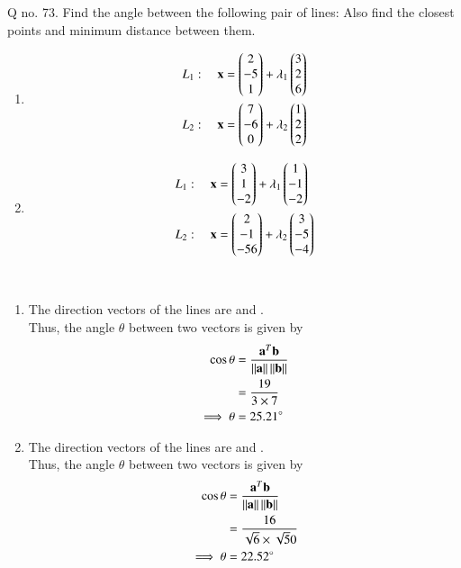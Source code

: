 \documentclass[journal,12pt,twocolumn]{IEEEtran}
\begin{document}
\noindent Q no. 73. Find the angle between the following pair of lines: Also find the closest points and minimum distance between them.
\begin{enumerate}
\item
\begin{align}
L_1: \quad \mathbf{x} &= \begin{pmatrix}2\\-5\\1\end{pmatrix} + \lambda_1\begin{pmatrix}3 \\ 2 \\6\end{pmatrix}
\\
L_2: \quad \mathbf{x} &= \begin{pmatrix}7\\-6\\0\end{pmatrix} + \lambda_2\begin{pmatrix}1 \\ 2 \\2\end{pmatrix}
\end{align}
\item
\begin{align}
L_1: \quad \mathbf{x} &= \begin{pmatrix}3\\1\\-2\end{pmatrix} + \lambda_1\begin{pmatrix}1 \\ -1 \\-2\end{pmatrix}
\\
L_2: \quad \mathbf{x} &= \begin{pmatrix}2\\-1\\-56\end{pmatrix} + \lambda_2\begin{pmatrix}3 \\ -5 \\-4\end{pmatrix}
\end{align}
\end{enumerate}
%
\\
\solution 
\begin{enumerate}
\item The direction vectors of the lines are
 and . \\
Thus, the angle $\theta$ between two vectors is given by 
%
\begin{align}
\label{eq:line_scalar_prod}
\cos \theta &= \frac{\mathbf{a}^T\mathbf{b}}{\left\lVert\mathbf{a}\right\rVert\left\lVert\mathbf{b}\right\rVert}
\\
&=\frac{19}{3\times7}
\\
\implies \theta &= 25.21\degree
\end{align}
\item The direction vectors of the lines are
 and . \\
Thus, the angle $\theta$ between two vectors is given by 
%
\begin{align}
\label{eq:line_scalar_prod}
\cos \theta &= \frac{\mathbf{a}^T\mathbf{b}}{\left\lVert\mathbf{a}\right\rVert\left\lVert\mathbf{b}\right\rVert}
\\
&=\frac{16}{\sqrt6\times\sqrt50}
\\
\implies \theta &= 22.52\degree
\end{align}
\end{enumerate} 
\end{document}
